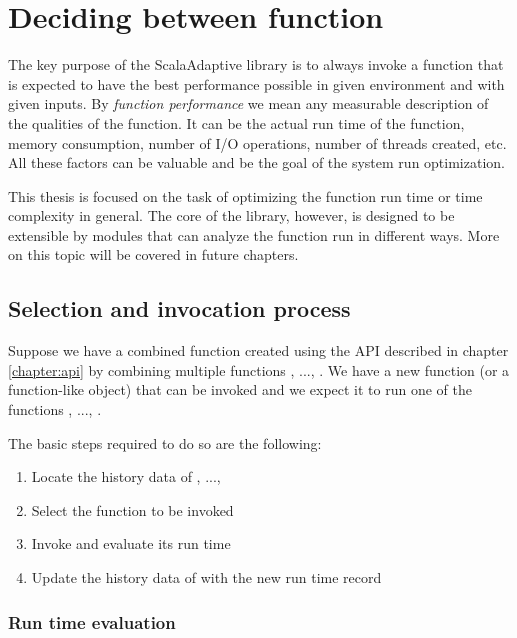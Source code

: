 \chapter{Deciding between function}
\label{chap:deciding}

The key purpose of the ScalaAdaptive library is to always invoke a function that is expected to have the best performance possible in given environment and with given inputs. By \textit{function performance} we mean any measurable description of the qualities of the function. It can be the actual run time of the function, memory consumption, number of I/O operations, number of threads created, etc. All these factors can be valuable and be the goal of the system run optimization.

This thesis is focused on the task of optimizing the function run time or time complexity in general. The core of the library, however, is designed to be extensible by modules that can analyze the function run in different ways. More on this topic will be covered in future chapters. %

\section{Selection and invocation process}
\label{sec:selection_and_invocation_process}

Suppose we have a combined function  created using the API described in chapter \ref{chapter:api} by combining multiple functions , ..., . We have a new function (or a function-like object) that can be invoked and we expect it to run one of the functions , ..., .

The basic steps required to do so are the following:

\begin{enumerate}
	\item Locate the history data of , ..., 
	\item Select the function  to be invoked
	\item Invoke  and evaluate its run time
	\item Update the history data of  with the new run time record
\end{enumerate}

\subsection{Run time evaluation}


